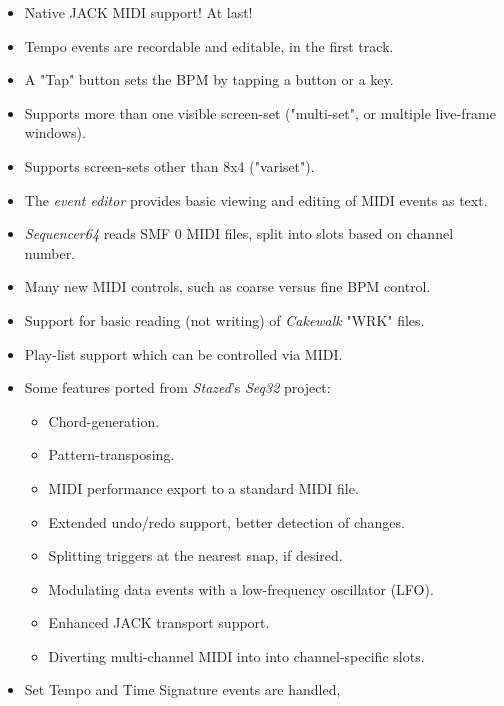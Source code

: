 \documentclass[
 11pt,
 twoside,
 a4paper,
 headinclude,
 footinclude,
 final                                 %
]{article}
\begin{document}
   \begin{itemize}
      \item Native JACK MIDI support!  At last!
      \item Tempo events are recordable and editable, in the first track.
      \item A "Tap" button sets the BPM by tapping a button or a key.
      \item Supports more than one visible screen-set ("multi-set", or
         multiple live-frame windows).

      \item Supports screen-sets other than 8x4 ("variset").
      \item The \textsl{event editor}
         provides basic viewing and editing of MIDI events as text.
      \item \textsl{Sequencer64} reads SMF 0 MIDI files, split
         into slots based on channel number.
      \item Many new MIDI controls, such as coarse versus fine BPM control.
      \item Support for basic reading (not writing) of
         \textsl{Cakewalk} "WRK" files.
      \item Play-list support which can be controlled via MIDI.
      \item Some features ported from \textsl{Stazed}'s
         \textsl{Seq32} \cite{seq32} project:
         \begin{itemize}
            \item Chord-generation.
            \item Pattern-transposing.
            \item MIDI performance export to a standard MIDI file.
            \item Extended undo/redo support, better detection of changes.
            \item Splitting triggers at the nearest snap, if desired.
            \item Modulating data events with a low-frequency oscillator (LFO).
            \item Enhanced JACK transport support.
            \item Diverting multi-channel MIDI into into channel-specific slots.
         \end{itemize}
      \item Set Tempo and Time Signature events are handled,

\end{itemize}
\end{document}
